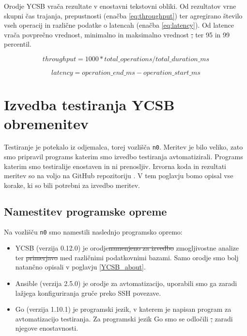 \documentclass[a4paper, 12pt]{book}
\providecommand{\DIFaddtex}[1]{{\protect\color{blue}\uwave{#1}}} %
\providecommand{\DIFdeltex}[1]{{\protect\color{red}\sout{#1}}}                      %
\providecommand{\DIFaddbegin}{} %
\providecommand{\DIFaddend}{} %
\providecommand{\DIFdelbegin}{} %
\providecommand{\DIFdelend}{} %
\providecommand{\DIFadd}[1]{\texorpdfstring{\DIFaddtex{#1}}{#1}} %
\providecommand{\DIFdel}[1]{\texorpdfstring{\DIFdeltex{#1}}{}} %
\newcommand{\DIFscaledelfig}{0.5}
\newlength{\DIFdelgraphicswidth} %
\newlength{\DIFdelgraphicsheight} %
\newcommand{\DIFaddincludegraphics}[2][]{{\color{blue}\fbox{\DIFOincludegraphics[#1]{#2}}}} %
\newcommand{\DIFdelincludegraphics}[2][]{%
\sbox{\DIFdelgraphicsbox}{\DIFOincludegraphics[#1]{#2}}%
\settoboxwidth{\DIFdelgraphicswidth}{\DIFdelgraphicsbox} %
\settoboxtotalheight{\DIFdelgraphicsheight}{\DIFdelgraphicsbox} %
\scalebox{\DIFscaledelfig}{%
\parbox[b]{\DIFdelgraphicswidth}{\usebox{\DIFdelgraphicsbox}\\[-\baselineskip] \rule{\DIFdelgraphicswidth}{0em}}\llap{\resizebox{\DIFdelgraphicswidth}{\DIFdelgraphicsheight}{%
\setlength{\unitlength}{\DIFdelgraphicswidth}%
\begin{picture}(1,1)%
\thicklines\linethickness{2pt} %
{\color[rgb]{1,0,0}\put(0,0){\framebox(1,1){}}}%
{\color[rgb]{1,0,0}\put(0,0){\line( 1,1){1}}}%
{\color[rgb]{1,0,0}\put(0,1){\line(1,-1){1}}}%
\end{picture}%
}\hspace*{3pt}}} %
} %
\DeclareRobustCommand{\DIFaddbegin}{\DIFOaddbegin \let\includegraphics\DIFaddincludegraphics} %
\DeclareRobustCommand{\DIFaddend}{\DIFOaddend \let\includegraphics\DIFOincludegraphics} %
\DeclareRobustCommand{\DIFdelbegin}{\DIFOdelbegin \let\includegraphics\DIFdelincludegraphics} %
\DeclareRobustCommand{\DIFdelend}{\DIFOaddend \let\includegraphics\DIFOincludegraphics} %
\begin{document}
Orodje YCSB vrača rezultate v enostavni tekstovni obliki. Od rezultatov vrne skupni čas trajanja, prepustnosti (enačba \ref{eq:throughput}) ter agregirano število vseh operacij in različne podatke o latencah (enačba \ref{eq:latency}). Od latence vrača povprečno vrednost, minimalno in maksimalno vrednost \DIFdelbegin \DIFdel{, }\DIFdelend ter 95 in 99 percentil.

\begin{equation} \label{eq:throughput}
throughput = 1000 * total\_operations / total\_duration\_ms
\end{equation}

\begin{equation} \label{eq:latency}
latency = operation\_end\_ms - operation\_start\_ms
\end{equation}

\section{Izvedba testiranja YCSB obremenitev}
\label{YCSB_benchmarking_steps}
Testiranje je potekalo iz odjemalca, torej vozlišča \texttt{n0}. Meritev je bilo veliko, zato smo pripravil program\DIFaddbegin \DIFadd{, }\DIFaddend s katerim smo izvedbo testiranja avtomatizirali. Program\DIFaddbegin \DIFadd{, }\DIFaddend s katerim smo testirali\DIFaddbegin \DIFadd{, }\DIFaddend je enostaven in ni prenosljiv. Izvorna koda in rezultati meritev so na voljo na GitHub repozitoriju \cite{matjazmav/diploma-ycsb}. V tem poglavju bomo opisal vse korake, ki so bili potrebni za izvedbo meritev.

\subsection{Namestitev programske opreme}
Na vozlišču \texttt{n0} smo namestili naslednjo programsko opremo:
\begin{itemize}
    \item YCSB (verzija 0.12.0) \cite{brianfrankcooper/YCSB} je orodje\DIFdelbegin \DIFdel{namenjeno za izvedbo }\DIFdelend \DIFaddbegin \DIFadd{, namenjeno izvedbi }\DIFaddend zmogljivostne analize ter \DIFdelbegin \DIFdel{primerjavo }\DIFdelend \DIFaddbegin \DIFadd{primerjavi }\DIFaddend med različnimi podatkovnimi bazami. Samo orodje smo bolj natančno opisali v poglavju \ref{YCSB_about}.
    \item Ansible (verzija 2.5.0) \cite{Ansible} je orodje za avtomatizacijo, uporabili smo ga zaradi lažjega konfiguriranja gruče preko SSH povezave.
    \item Go (verzija 1.10.1) \cite{Golang} je programski jezik, v katerem je napisan program za avtomatizacijo testiranja. Za programski jezik Go smo se odločili \DIFdelbegin \DIFdel{, }\DIFdelend zaradi njegove enostavnosti.
\end{itemize} 
\end{document}

